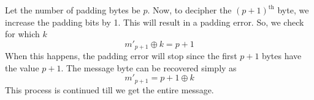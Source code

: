 \documentclass[a4paper, 11pt]{article}
\begin{document}
Let the number of padding bytes be $p$. Now, to decipher the $(p+1)^\text{th}$ byte, we increase the padding bits by 1. This will result in a padding error. So, we check for which $k$ 
$$m'_{p+1}\oplus k = p+1$$
When this happens, the padding error will stop since the first $p+1$ bytes have the value $p+1$. The message byte can be recovered simply as
$$m'_{p+1} = p+1\oplus k$$
This process is continued till we get the entire message.
\end{document}

